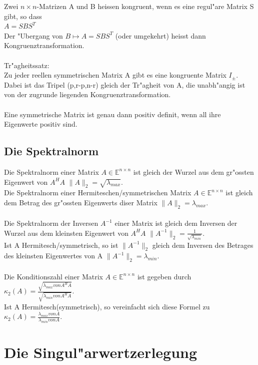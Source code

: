 \documentclass[10pt, a4paper, twocolumn]{scrartcl}
\begin{document}
Zwei $n \times n$-Matrizen A und B heissen kongruent, wenn es eine regul"are Matrix S gibt, so dass\\
$A=SBS^T$\\
Der "Ubergang von $B\mapsto A=SBS^T$ (oder umgekehrt) heisst dann Kongruenztransformation.\\\\

Tr"agheitssatz:\\
Zu jeder reellen symmetrischen Matrix A gibt es eine kongruente Matrix $I_{\pm}$. Dabei ist das Tripel (p,r-p,n-r) gleich der Tr"agheit von A, die unabh"angig ist von der zugrunde liegenden Kongruenztransformation.\\\\

Eine symmetrische Matrix ist genau dann positiv definit, wenn all ihre Eigenwerte positiv sind.

\subsection{Die Spektralnorm}

Die Spektralnorm einer Matrix $A \in \mathbb{E}^{n\times n}$ ist gleich der Wurzel aus dem gr"ossten Eigenwert von $A^HA$ $\|A\|_2=\sqrt{\lambda_{max}}$.\\
Die Spektralnorm einer Hermiteschen/symmetrischen Matrix $A \in \mathbb{E}^{n\times n}$ ist gleich dem Betrag des gr"ossten Eigenwerts diser Matrix $\|A\|_2=\lambda_{max}$.\\\\

Die Spektralnorm der Inversen $A^{-1}$ einer Matrix ist gleich dem Inversen der Wurzel aus dem kleinsten Eigenwert von $A^HA$ $\|A^{-1}\|_2 = \frac{1}{\sqrt{\lambda_{min}}}$.\\
Ist A Hermitesch/symmetrisch, so ist $\|A^{-1}\|_2$ gleich dem Inversen des Betrages des kleinsten Eigenwertes von A $\|A^{-1}\|_2 = \lambda_{min}$.\\\\

Die Konditionszahl einer Matrix $A \in \mathbb{E}^{n \times n}$ ist gegeben durch $\kappa_2(A)= \frac{\sqrt{\lambda_{max} von A^HA}}{\sqrt{\lambda_{min} von A^HA}}$.\\
Ist A Hermitesch(symmetrisch), so vereinfacht sich diese Formel zu $\kappa_2(A)= \frac{\lambda_{max} von A}{\lambda_{min} von A}$.\\ 


\section{Die Singul"arwertzerlegung}
\end{document}
